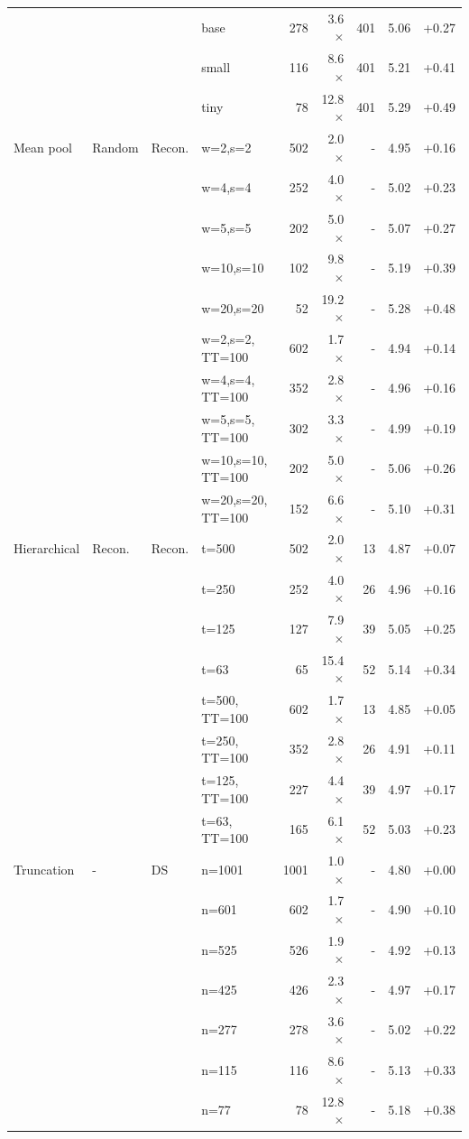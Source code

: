 \documentclass[11pt]{article}
\begin{document}
\begin{table}[htbp]
{\begin{tabular}{llllrrrrr}
 &  &  & base & 278 & 3.6$\times$ & 401 & 5.06 & +0.27 \\
 &  &  & small & 116 & 8.6$\times$ & 401 & 5.21 & +0.41 \\
 &  &  & tiny & 78 & 12.8$\times$ & 401 & 5.29 & +0.49 \\
\midrule
Mean pool & Random & Recon. & w=2,s=2 & 502 & 2.0$\times$ & - & 4.95 & +0.16 \\
 &  &  & w=4,s=4 & 252 & 4.0$\times$ & - & 5.02 & +0.23 \\
 &  &  & w=5,s=5 & 202 & 5.0$\times$ & - & 5.07 & +0.27 \\
 &  &  & w=10,s=10 & 102 & 9.8$\times$ & - & 5.19 & +0.39 \\
 &  &  & w=20,s=20 & 52 & 19.2$\times$ & - & 5.28 & +0.48 \\
 &  &  & w=2,s=2, TT=100 & 602 & 1.7$\times$ & - & 4.94 & +0.14 \\
 &  &  & w=4,s=4, TT=100 & 352 & 2.8$\times$ & - & 4.96 & +0.16 \\
 &  &  & w=5,s=5, TT=100 & 302 & 3.3$\times$ & - & 4.99 & +0.19 \\
 &  &  & w=10,s=10, TT=100 & 202 & 5.0$\times$ & - & 5.06 & +0.26 \\
 &  &  & w=20,s=20, TT=100 & 152 & 6.6$\times$ & - & 5.10 & +0.31 \\
\midrule
Hierarchical & Recon. & Recon. & t=500 & 502 & 2.0$\times$ & 13 & 4.87 & +0.07 \\
 &  &  & t=250 & 252 & 4.0$\times$ & 26 & 4.96 & +0.16 \\
 &  &  & t=125 & 127 & 7.9$\times$ & 39 & 5.05 & +0.25 \\
 &  &  & t=63 & 65 & 15.4$\times$ & 52 & 5.14 & +0.34 \\
 &  &  & t=500, TT=100 & 602 & 1.7$\times$ & 13 & 4.85 & +0.05 \\
 &  &  & t=250, TT=100 & 352 & 2.8$\times$ & 26 & 4.91 & +0.11 \\
 &  &  & t=125, TT=100 & 227 & 4.4$\times$ & 39 & 4.97 & +0.17 \\
 &  &  & t=63, TT=100 & 165 & 6.1$\times$ & 52 & 5.03 & +0.23 \\
\midrule
Truncation & - & DS & n=1001 & 1001 & 1.0$\times$ & - & 4.80 & +0.00 \\
 &  &  & n=601 & 602 & 1.7$\times$ & - & 4.90 & +0.10 \\
 &  &  & n=525 & 526 & 1.9$\times$ & - & 4.92 & +0.13 \\
 &  &  & n=425 & 426 & 2.3$\times$ & - & 4.97 & +0.17 \\
 &  &  & n=277 & 278 & 3.6$\times$ & - & 5.02 & +0.22 \\
 &  &  & n=115 & 116 & 8.6$\times$ & - & 5.13 & +0.33 \\
 &  &  & n=77 & 78 & 12.8$\times$ & - & 5.18 & +0.38 \\
\bottomrule
\end{tabular}
}
\end{table}
\end{document}
